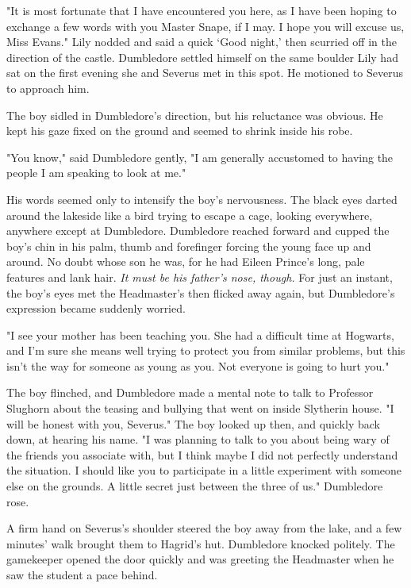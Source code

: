 \documentclass[a4paper,11pt]{article}
\begin{document}
"It is most fortunate that I have encountered you here, as I have been hoping to exchange a few words with you Master Snape, if I may. I hope you will excuse us, Miss Evans." Lily nodded and said a quick `Good night,' then scurried off in the direction of the castle. Dumbledore settled himself on the same boulder Lily had sat on the first evening she and Severus met in this spot. He motioned to Severus to approach him.

The boy sidled in Dumbledore's direction, but his reluctance was obvious. He kept his gaze fixed on the ground and seemed to shrink inside his robe.

"You know," said Dumbledore gently, "I am generally accustomed to having the people I am speaking to look at me."

His words seemed only to intensify the boy's nervousness. The black eyes darted around the lakeside like a bird trying to escape a cage, looking everywhere, anywhere except at Dumbledore. Dumbledore reached forward and cupped the boy's chin in his palm, thumb and forefinger forcing the young face up and around. No doubt whose son he was, for he had Eileen Prince's long, pale features and lank hair. \emph{It must be his father's nose, though.} For just an instant, the boy's eyes met the Headmaster's then flicked away again, but Dumbledore's expression became suddenly worried.

"I see your mother has been teaching you. She had a difficult time at Hogwarts, and I'm sure she means well trying to protect you from similar problems, but this isn't the way for someone as young as you. Not everyone is going to hurt you."

The boy flinched, and Dumbledore made a mental note to talk to Professor Slughorn about the teasing and bullying that went on inside Slytherin house. "I will be honest with you, Severus." The boy looked up then, and quickly back down, at hearing his name. "I was planning to talk to you about being wary of the friends you associate with, but I think maybe I did not perfectly understand the situation. I should like you to participate in a little experiment with someone else on the grounds. A little secret just between the three of us." Dumbledore rose.

A firm hand on Severus's shoulder steered the boy away from the lake, and a few minutes' walk brought them to Hagrid's hut. Dumbledore knocked politely. The gamekeeper opened the door quickly and was greeting the Headmaster when he saw the student a pace behind.
\end{document}
